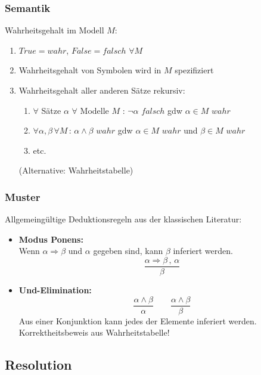 \subsubsection*{Semantik}
Wahrheitsgehalt im Modell $M$:
\begin{enumerate}
\item $True = wahr$, $False = falsch$ $\forall M$
\item Wahrheitsgehalt von Symbolen wird in $M$ spezifiziert
\item Wahrheitsgehalt aller anderen Sätze rekursiv:
\begin{enumerate}
\item $\forall$ Sätze $\alpha$ $\forall$ Modelle $M$ : $\neg \alpha$ $falsch$ gdw $\alpha \in M$ $wahr$
\item $\forall \alpha,\beta \, \forall M \, : \, \alpha \wedge \beta \,\, wahr$ gdw $\alpha \in M \,\, wahr$ und $\beta \in M \,\, wahr$
\item etc.
\end{enumerate}
(Alternative: Wahrheitstabelle)
\end{enumerate}

\subsubsection*{Muster}

Allgemeingültige Deduktionsregeln aus der klassischen Literatur:
\begin{itemize}
\item \textbf{Modus Ponens:} \\ Wenn $\alpha \Rightarrow \beta$ und $\alpha$ gegeben sind, kann $\beta$ inferiert werden. $$\frac{\alpha \Rightarrow \beta \, , \, \alpha}{\beta}$$
\item \textbf{Und-Elimination:} $$\frac{\alpha \wedge \beta}{\alpha} \qquad \frac{\alpha \wedge \beta}{\beta}$$ Aus einer Konjunktion kann jedes der Elemente inferiert werden. \\ Korrektheitsbeweis aus Wahrheitstabelle!
\end{itemize}

\subsection{Resolution}

